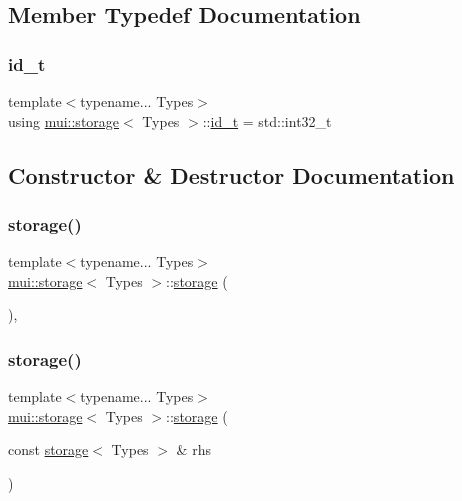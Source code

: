 \subsection{Member Typedef Documentation}
\mbox{\label{structmui_1_1storage_a1e1d8c3e802463d4b0e3804865e365de}} 
\subsubsection{\texorpdfstring{id\+\_\+t}{id\_t}}
{\footnotesize\ttfamily template$<$typename... Types$>$ \\
using \hyperlink{structmui_1_1storage}{mui\+::storage}$<$ Types $>$\+::\hyperlink{structmui_1_1storage_a1e1d8c3e802463d4b0e3804865e365de}{id\+\_\+t} =  std\+::int32\+\_\+t}



\subsection{Constructor \& Destructor Documentation}
\mbox{\label{structmui_1_1storage_a9bb5dc71b97c97a84271d5be1220bb96}} 
\subsubsection{\texorpdfstring{storage()}{storage()}\hspace{0.1cm}{\footnotesize\ttfamily [1/5]}}
{\footnotesize\ttfamily template$<$typename... Types$>$ \\
\hyperlink{structmui_1_1storage}{mui\+::storage}$<$ Types $>$\+::\hyperlink{structmui_1_1storage}{storage} (\begin{DoxyParamCaption}{ }\end{DoxyParamCaption})\hspace{0.3cm}{\ttfamily [inline]}, {\ttfamily [noexcept]}}

\mbox{\label{structmui_1_1storage_a758ceb44dccb01bca5c67618ff268afb}} 
\subsubsection{\texorpdfstring{storage()}{storage()}\hspace{0.1cm}{\footnotesize\ttfamily [2/5]}}
{\footnotesize\ttfamily template$<$typename... Types$>$ \\
\hyperlink{structmui_1_1storage}{mui\+::storage}$<$ Types $>$\+::\hyperlink{structmui_1_1storage}{storage} (\begin{DoxyParamCaption}\item[{const \hyperlink{structmui_1_1storage}{storage}$<$ Types $>$ \&}]{rhs }\end{DoxyParamCaption})\hspace{0.3cm}{\ttfamily [inline]}}

